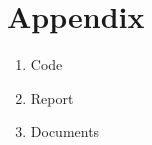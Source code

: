 \appendix
\section{Appendix}
\label{sec:bilag}

\begin{enumerate}[noitemsep]
	
	\item Code
	
	\item Report 
	
	\item Documents
	
\end{enumerate}